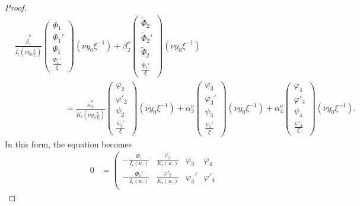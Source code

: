 \documentclass[11 pt]{amsart}
\theoremstyle{definition}
\theoremstyle{remark}
\numberwithin{equation}{section}
\begin{document}
\begin{proof}
  \begin{align*}
& \frac{\widetilde \beta_1^{\nu}}{I_i \left( \nu y_0 \frac{\kappa}{\xi} \right)}
    \left(\begin{array}{c}
      \Phi_1\\
      \Phi_1'\\
      \Psi_1\\
      \frac{\Psi_1'}{\xi}
    \end{array}\right) (\nu y_0 \xi^{- 1}) + \beta^{\nu}_2 \left(\begin{array}{c}
      \widetilde{\Phi}_2\\
      \widetilde{\Phi}_2'\\
      \widetilde{\Psi}_2\\
      \frac{\widetilde{\Psi}_2'}{\xi}
    \end{array}\right) (\nu y_0 \xi^{- 1})\\
    & \qquad \qquad \qquad =  \frac{\widetilde \alpha_2^{\nu}}{K_i \left( \nu y_0\frac{\kappa}{\xi} \right)}
    \left(\begin{array}{c}
      \varphi_2\\
      \varphi'_2\\
      \psi_2\\
      \frac{\psi_2'}{\xi}
    \end{array}\right) (\nu y_0 \xi^{- 1}) + \alpha^{\nu}_3 \left(\begin{array}{c}
      \varphi_3\\
      \varphi_3'\\
      \psi_3\\
      \frac{\psi_3'}{\xi}
    \end{array}\right) (\nu y_0 \xi^{- 1}) + \alpha^{\nu}_4 \left(\begin{array}{c}
      \varphi_4\\
      \varphi'_4\\
      \psi_4\\
      \frac{\psi'_4}{\xi}
    \end{array}\right) (\nu y_0 \xi^{- 1}).
  \end{align*}
 In this form, the equation becomes
\begin{align*}
    0 & =  \left(\begin{array}{cccc}
      - \frac{\Phi_1}{I_i (\kappa .)} & \frac{\varphi_2}{K_i (\kappa .)} &
      \varphi_3 & \varphi_4\\
      - \frac{\Phi_1'}{I_i (\kappa .)} & \frac{\varphi'_2}{K_i (\kappa .)} &
      \varphi_3' & \varphi'_4\\

\end{array}
\end{align*}
\end{proof}
\end{document}
